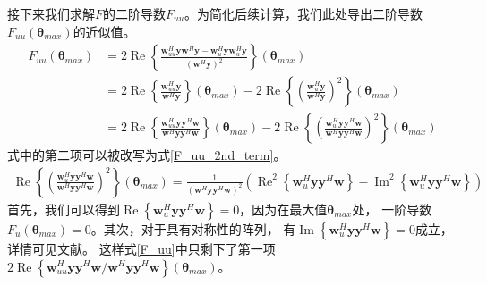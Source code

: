 \documentclass[master]{thesis-uestc}
\begin{document}
接下来我们求解$F$的二阶导数$F_{uu}$。为简化后续计算，我们此处导出二阶导数$F_{uu}(\bm{\theta}_{max})$的近似值。
\begin{equation}\label{F_uu}
    \begin{aligned}
        F_{uu}(\bm{\theta}_{max}) &= 2\operatorname{Re}
        \left\{\frac{\bm{w}^H_{uu}\bm{y}\bm{w}^H\bm{y}-\bm{w}^H_u\bm{y}\bm{w}^H_u\bm{y}}
        {\left( \bm{w}^H\bm{y} \right)^2}\right\}(\bm{\theta}_{max}) \\
        &= 2\operatorname{Re}\left\{\frac{\bm{w}^H_{uu}\bm{y}}{\bm{w}^H\bm{y}}\right\}(\bm{\theta}_{max}) - 
           2\operatorname{Re}\left\{\left(\frac{\bm{w}^H_{u}\bm{y}}{\bm{w}^H\bm{y}}\right)^2\right\}(\bm{\theta}_{max})
           \\
        &= 2\operatorname{Re}\left\{\frac{\bm{w}^H_{uu}\bm{y}\bm{y}^H\bm{w}}
                                    {\bm{w}^H\bm{y}\bm{y}^H\bm{w}}\right\}(\bm{\theta}_{max}) - 
           2\operatorname{Re}\left\{\left(\frac{\bm{w}^H_{u}\bm{y}\bm{y}^H\bm{w}}
                                    {\bm{w}^H\bm{y}\bm{y}^H\bm{w}}\right)^2\right\}(\bm{\theta}_{max})
    \end{aligned}
\end{equation}
式\label{F_uu}中的第二项可以被改写为式\eqref{F_uu_2nd_term}。
\begin{equation}\label{F_uu_2nd_term}
    \begin{aligned}
        \operatorname{Re}\left\{\left(\frac{\bm{w}^H_{u}\bm{y}\bm{y}^H\bm{w}}
                                {\bm{w}^H\bm{y}\bm{y}^H\bm{w}}\right)^2\right\}(\bm{\theta}_{max})
        = \frac{1}{\left(\bm{w}^H\bm{y}\bm{y}^H\bm{w}\right)^2}
          \left(\operatorname{Re}^2\left\{\bm{w}^H_{u}\bm{y}\bm{y}^H\bm{w}\right\}-
          \operatorname{Im}^2\left\{\bm{w}^H_{u}\bm{y}\bm{y}^H\bm{w}\right\}\right)
    \end{aligned}
\end{equation}
首先，我们可以得到$\operatorname{Re}\left\{\bm{w}^H_{u}\bm{y}\bm{y}^H\bm{w}\right\}=0$，因为在最大值$\bm{\theta}_{max}$处，
一阶导数$F_u(\bm{\theta}_{max})=0$。其次，对于具有对称性的阵列，
有$\operatorname{Im}\left\{\bm{w}^H_{u}\bm{y}\bm{y}^H\bm{w}\right\}=0$成立，详情可见文献\cite{Nickel_93}。
这样式\eqref{F_uu}中只剩下了第一项
$2\operatorname{Re}\left\{\bm{w}^H_{uu}\bm{y}\bm{y}^H\bm{w}/\bm{w}^H\bm{y}\bm{y}^H\bm{w}\right\}(\bm{\theta}_{max})$。
\end{document}
